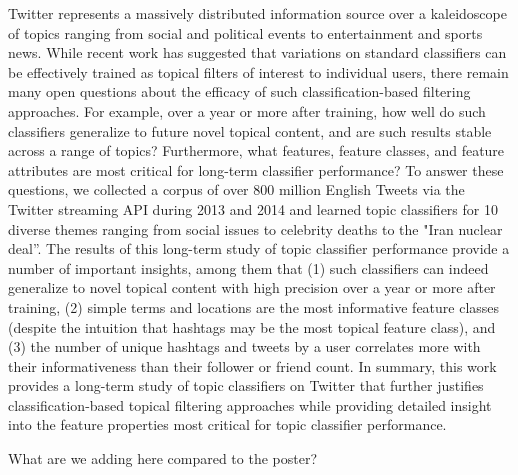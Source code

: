 
Twitter represents a massively distributed information source over a kaleidoscope of topics ranging from social and political events to entertainment and sports news.  While recent work has suggested that variations on standard classifiers can be effectively trained as topical filters of interest to individual users, there remain many open questions about the efficacy of such classification-based filtering approaches.  For example, over a year or more after training, how well do such classifiers generalize to future novel topical content, and are such results stable across a range of topics?  Furthermore, what features, feature classes, and feature attributes are most critical for long-term classifier performance?  To answer these questions, we collected a corpus of over 800 million English Tweets via the Twitter streaming API during 2013 and 2014 and learned topic classifiers for 10 diverse themes ranging from social issues to celebrity deaths to the "Iran nuclear deal''.  The results of this long-term study of topic classifier performance provide a number of important insights, among them that (1) such classifiers can indeed generalize to novel topical content with high precision over a year or more after training, (2) simple terms and locations are the most informative feature classes (despite the intuition that hashtags may be the most topical feature class), and (3) the number of unique hashtags and tweets by a user correlates more with their informativeness than their follower or friend count.  In summary, this work provides a long-term study of topic classifiers on Twitter that further justifies classification-based topical filtering approaches while providing detailed insight into the feature properties most critical for topic classifier performance.

{\color{red} What are we adding here compared to the poster?}